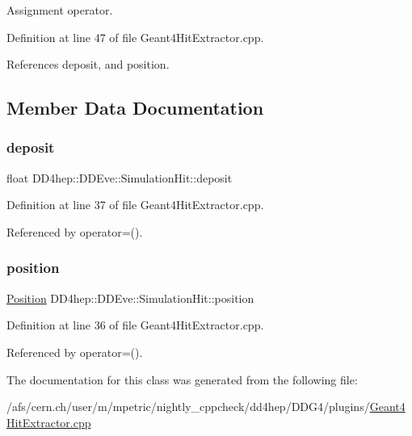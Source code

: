 Assignment operator. 



Definition at line 47 of file Geant4\+Hit\+Extractor.\+cpp.



References deposit, and position.



\subsection{Member Data Documentation}
\hypertarget{class_d_d4hep_1_1_d_d_eve_1_1_simulation_hit_a96d56e1a81de2176ab0e856ba6394799}{}\label{class_d_d4hep_1_1_d_d_eve_1_1_simulation_hit_a96d56e1a81de2176ab0e856ba6394799} 
\subsubsection{\texorpdfstring{deposit}{deposit}}
{\footnotesize\ttfamily float D\+D4hep\+::\+D\+D\+Eve\+::\+Simulation\+Hit\+::deposit}



Definition at line 37 of file Geant4\+Hit\+Extractor.\+cpp.



Referenced by operator=().

\hypertarget{class_d_d4hep_1_1_d_d_eve_1_1_simulation_hit_a3ac34457c4fec010a96bdd309c14544c}{}\label{class_d_d4hep_1_1_d_d_eve_1_1_simulation_hit_a3ac34457c4fec010a96bdd309c14544c} 
\subsubsection{\texorpdfstring{position}{position}}
{\footnotesize\ttfamily \hyperlink{namespace_d_d4hep_1_1_geometry_a55083902099d03506c6db01b80404900}{Position} D\+D4hep\+::\+D\+D\+Eve\+::\+Simulation\+Hit\+::position}



Definition at line 36 of file Geant4\+Hit\+Extractor.\+cpp.



Referenced by operator=().



The documentation for this class was generated from the following file\+:\begin{DoxyCompactItemize}
\item 
/afs/cern.\+ch/user/m/mpetric/nightly\+\_\+cppcheck/dd4hep/\+D\+D\+G4/plugins/\hyperlink{_geant4_hit_extractor_8cpp}{Geant4\+Hit\+Extractor.\+cpp}\end{DoxyCompactItemize}
